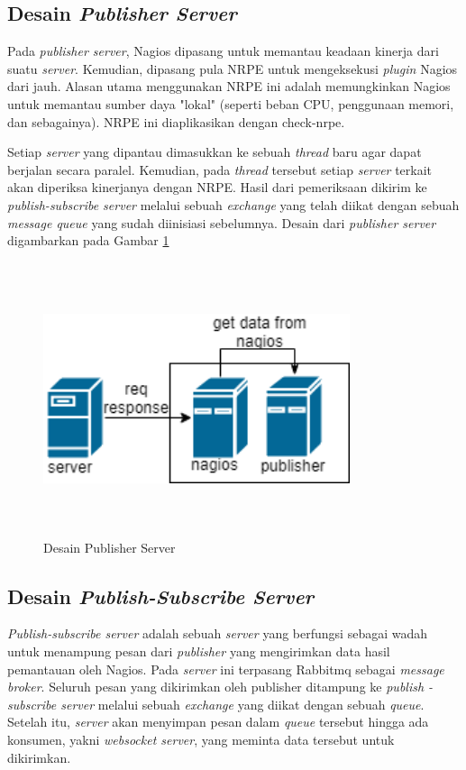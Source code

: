 \subsection{Desain \textit{Publisher Server}}
Pada \textit{publisher server}, Nagios dipasang untuk memantau keadaan kinerja dari suatu \textit{server}. Kemudian, dipasang pula NRPE untuk mengeksekusi \textit{plugin} Nagios dari jauh. Alasan utama menggunakan NRPE ini adalah memungkinkan Nagios untuk memantau sumber daya "lokal" (seperti beban CPU, penggunaan memori, dan sebagainya). NRPE ini diaplikasikan dengan check-nrpe.

Setiap \textit{server} yang dipantau dimasukkan ke sebuah \textit{thread} baru agar dapat berjalan secara paralel. Kemudian, pada \textit{thread} tersebut setiap \textit{server} terkait akan diperiksa kinerjanya dengan NRPE. Hasil dari pemeriksaan dikirim ke \textit{publish-subscribe server} melalui sebuah \textit{exchange} yang telah diikat dengan sebuah \textit{message queue} yang sudah diinisiasi sebelumnya. Desain dari \textit{publisher server} digambarkan pada Gambar \ref{fig:publisher}

\begin{figure}[H]
	\centering
	\includegraphics[width=9cm,height=8cm]{assets/images/publisher.png}
	\caption{Desain Publisher Server}
	\label{fig:publisher}
\end{figure}


\subsection{Desain \textit{Publish-Subscribe Server}}
\textit{Publish-subscribe server} adalah sebuah \textit{server} yang berfungsi sebagai wadah untuk menampung pesan dari \textit{publisher} yang mengirimkan data hasil pemantauan oleh Nagios. Pada \textit{server} ini terpasang Rabbitmq sebagai \textit{message broker}. Seluruh pesan yang dikirimkan oleh publisher ditampung ke \textit{publish -subscribe server} melalui sebuah \textit{exchange} yang diikat dengan sebuah \textit{queue}. Setelah itu, \textit{server} akan menyimpan pesan dalam \textit{queue} tersebut hingga ada konsumen, yakni \textit{websocket server}, yang meminta data tersebut untuk dikirimkan.

